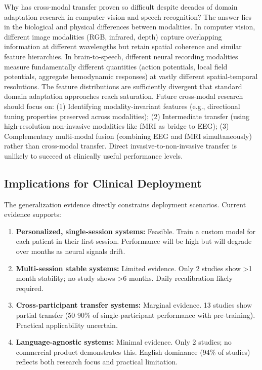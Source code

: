 Why has cross-modal transfer proven so difficult despite decades of domain adaptation research in computer vision and speech recognition? The answer lies in the biological and physical differences between modalities. In computer vision, different image modalities (RGB, infrared, depth) capture overlapping information at different wavelengths but retain spatial coherence and similar feature hierarchies. In brain-to-speech, different neural recording modalities measure fundamentally different quantities (action potentials, local field potentials, aggregate hemodynamic responses) at vastly different spatial-temporal resolutions. The feature distributions are sufficiently divergent that standard domain adaptation approaches reach saturation. Future cross-modal research should focus on: (1) Identifying modality-invariant features (e.g., directional tuning properties preserved across modalities); (2) Intermediate transfer (using high-resolution non-invasive modalities like fMRI as bridge to EEG); (3) Complementary multi-modal fusion (combining EEG and fMRI simultaneously) rather than cross-modal transfer. Direct invasive-to-non-invasive transfer is unlikely to succeed at clinically useful performance levels.

\subsection{Implications for Clinical Deployment}

The generalization evidence directly constrains deployment scenarios. Current evidence supports:
\begin{enumerate}
    \item \textbf{Personalized, single-session systems:} Feasible. Train a custom model for each patient in their first session. Performance will be high but will degrade over months as neural signals drift.
    
    \item \textbf{Multi-session stable systems:} Limited evidence. Only 2 studies show >1 month stability; no study shows >6 months. Daily recalibration likely required.
    
    \item \textbf{Cross-participant transfer systems:} Marginal evidence. 13 studies show partial transfer (50-90\% of single-participant performance with pre-training). Practical applicability uncertain.
    
    \item \textbf{Language-agnostic systems:} Minimal evidence. Only 2 studies; no commercial product demonstrates this. English dominance (94\% of studies) reflects both research focus and practical limitation.
\end{enumerate}

